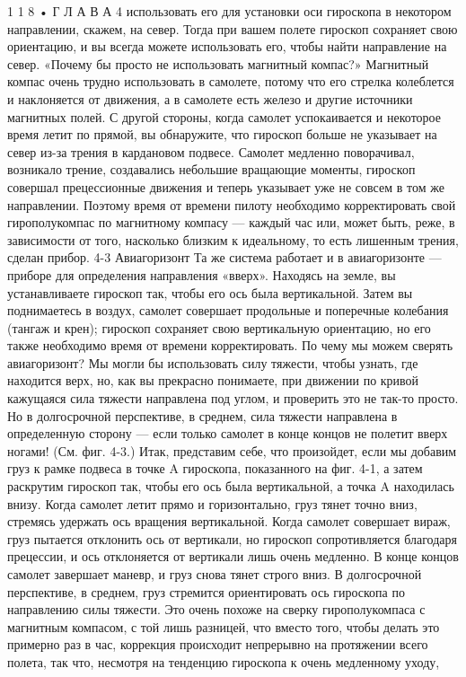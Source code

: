 \documentclass[10pt,oneside]{article}
\begin{document}
1 1 8 • Г Л А В А  4 использовать его для установки оси гироскопа в некотором направлении, скажем, на север. Тогда при вашем полете гироскоп сохраняет свою ориентацию, и вы всегда можете использовать его, чтобы найти направление на север. «Почему бы просто не использовать магнитный компас?» Магнитный компас очень трудно использовать в самолете, потому что его стрелка колеблется и наклоняется от движения, а в самолете есть железо и другие источники магнитных полей. С другой стороны, когда самолет успокаивается и некоторое время летит по прямой, вы обнаружите, что гироскоп больше не указывает на север из-за трения в кардановом подвесе. Самолет медленно поворачивал, возникало трение, создавались небольшие вращающие моменты, гироскоп совершал прецессионные движения и теперь указывает уже не совсем в том же направлении. Поэтому время от времени пилоту необходимо корректировать свой гирополукомпас по магнитному компасу --- каждый час или, может быть, реже, в зависимости от того, насколько близким к идеальному, то есть лишенным трения, сделан прибор. 4-3 Авиагоризонт Та же система работает и в авиагоризонте --- приборе для определения направления «вверх». Находясь на земле, вы устанавливаете гироскоп так, чтобы его ось была вертикальной. Затем вы поднимаетесь в воздух, самолет совершает продольные и поперечные колебания (тангаж и крен); гироскоп сохраняет свою вертикальную ориентацию, но его также необходимо время от времени корректировать. По чему мы можем сверять авиагоризонт? Мы могли бы использовать силу тяжести, чтобы узнать, где находится верх, но, как вы прекрасно понимаете, при движении по кривой кажущаяся сила тяжести направлена под углом, и проверить это не так-то просто. Но в долгосрочной перспективе, в среднем, сила тяжести направлена в определенную сторону --- если только самолет в конце концов не полетит вверх ногами! (См. фиг. 4-3.) Итак, представим себе, что произойдет, если мы добавим груз к рамке подвеса в точке A гироскопа, показанного на фиг. 4-1, а затем раскрутим гироскоп так, чтобы его ось была вертикальной, а точка A находилась внизу. Когда самолет летит прямо и горизонтально, груз тянет точно вниз, стремясь удержать ось вращения вертикальной. Когда самолет совершает вираж, груз пытается отклонить ось от вертикали, но гироскоп сопротивляется благодаря прецессии, и ось отклоняется от вертикали лишь очень медленно. В конце концов самолет завершает маневр, и груз снова тянет строго вниз. В долгосрочной перспективе, в среднем, груз стремится ориентировать ось гироскопа по направлению силы тяжести. Это очень похоже на сверку гирополукомпаса с магнитным компасом, с той лишь разницей, что вместо того, чтобы делать это примерно раз в час, коррекция происходит непрерывно на протяжении всего полета, так что, несмотря на тенденцию гироскопа к очень медленному уходу,\par
\end{document}
